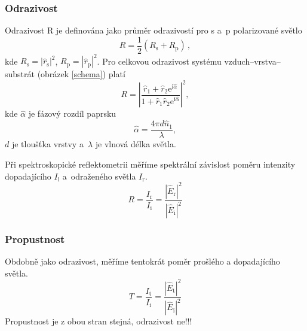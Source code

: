 \documentclass[12pt]{article}
\begin{document}
\subsubsection{Odrazivost}
Odrazivost R je definována jako průměr odrazivostí pro s a~p polarizované světlo 
%
\begin{equation} R = \frac{1}{2}(R_\mathrm{s} + R_\mathrm{p})\, \mathrm{,}\end{equation}
%
kde $R_\mathrm{s} = |\hat{r}_\mathrm{s}|^2$, $R_\mathrm{p} = |\hat{r}_\mathrm{p}|^2$.
Pro celkovou odrazivost systému vzduch--vrstva--substrát (obrázek \ref{schema}) platí 
\begin{equation} R = \left|\frac{\hat{r}_1 + \hat{r}_2 \mathrm{e}^{\mathrm{i}\hat{\alpha}} }{1 + \hat{r}_1 \hat{r}_2 \mathrm{e}^{\mathrm{i}\hat{\alpha}}}\right|^2 \mathrm{,} \label{Rvzo}\end{equation}
%
kde $\hat{\alpha}$ je fázový rozdíl paprsku  
\begin{equation} \hat{\alpha} = \frac{ 4 \pi d \hat{n}_1}{\lambda} \mathrm{,}\end{equation}
%
$d$ je tloušťka vrstvy a~$\lambda$ je vlnová délka světla. 

Při spektroskopické reflektometrii měříme spektrální závislost poměru intenzity dopadajícího $I_\mathrm{i}$ a~odraženého světla $I_\mathrm{r}$.
%
\begin{equation} R = \frac{I_\mathrm{r}}{I_\mathrm{i}} = \frac{|\hat{E}_\mathrm{r}|^2}{|\hat{E}_\mathrm{i}|^2}\end{equation}

\subsubsection{Propustnost}
Obdobně jako odrazivost, měříme tentokrát poměr prošlého a dopadajícího světla.
%
\begin{equation} T = \frac{I_\mathrm{t}}{I_\mathrm{i}} = \frac{|\hat{E}_\mathrm{t}|^2}{|\hat{E}_\mathrm{i}|^2}\end{equation}
Propustnost je z obou stran stejná, odrazivost ne!!!
\end{document}

